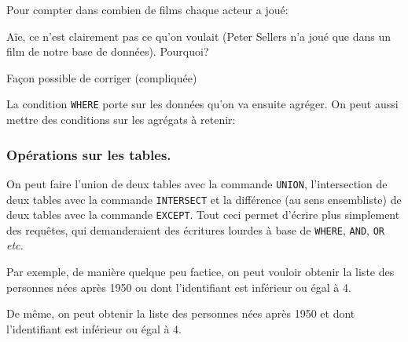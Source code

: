 Pour compter dans combien de
films chaque acteur a joué:


\begin{center}
\end{center}

Aïe, ce n'est clairement pas ce qu'on voulait (Peter Sellers n'a joué
que
dans un film de notre base de données). Pourquoi?

Façon possible de corriger (compliquée)

\begin{center}
\end{center}
La condition \texttt{WHERE} porte sur les données qu'on va ensuite
agréger. On peut aussi mettre des conditions sur les agrégats à
retenir:


\begin{center}
\end{center}

\subsubsection{Opérations sur les tables.}

On peut faire l'union de deux tables avec la commande \texttt{UNION}, l'intersection de deux tables avec la commande \texttt{INTERSECT} et la différence (au sens ensembliste) de deux tables avec la commande \texttt{EXCEPT}. 
Tout ceci permet d'écrire plus simplement des requêtes, qui demanderaient des écritures lourdes à base de \texttt{WHERE}, \texttt{AND}, \texttt{OR} \textit{etc.}

Par exemple, de manière quelque peu factice, on peut vouloir obtenir  la liste des personnes nées après 1950 ou dont l'identifiant est inférieur ou égal à 4. 


\begin{center}
\end{center}

De même, on peut obtenir la liste des personnes nées après 1950 et dont l'identifiant est inférieur ou égal à 4. 


\begin{center}
\end{center}


